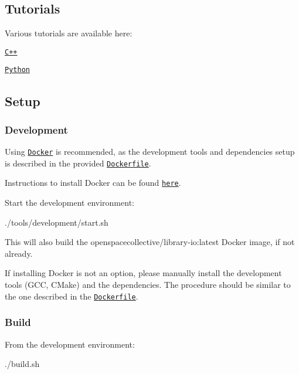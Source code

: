 \subsection*{Tutorials}

Various tutorials are available here\+:


\begin{DoxyItemize}
\item \href{./tutorials/cpp}{\tt C++}
\item \href{./tutorials/python}{\tt Python}
\end{DoxyItemize}

\subsection*{Setup}

\subsubsection*{Development}

Using \href{https://www.docker.com}{\tt Docker} is recommended, as the development tools and dependencies setup is described in the provided \href{./tools/development/docker/Dockerfile}{\tt Dockerfile}.

Instructions to install Docker can be found \href{https://docs.docker.com/install/}{\tt here}.

Start the development environment\+:


\begin{DoxyCode}
./tools/development/start.sh
\end{DoxyCode}


This will also build the {\ttfamily openspacecollective/library-\/io\+:latest} Docker image, if not already.

If installing Docker is not an option, please manually install the development tools (G\+CC, C\+Make) and the dependencies. The procedure should be similar to the one described in the \href{./tools/development/docker/Dockerfile}{\tt Dockerfile}.

\subsubsection*{Build}

From the development environment\+:


\begin{DoxyCode}
./build.sh
\end{DoxyCode}


